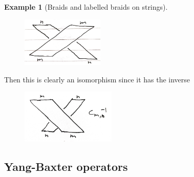 \documentclass[reqno]{amsart}
\theoremstyle{definition}
\newtheorem{example}[theorem]{Example}
\theoremstyle{remark}
\begin{document}
\begin{example}[Braids and labelled braids on strings]
       \begin{figure}[H]
           \centering
           \includegraphics[width=0.35\textwidth]{braiding-on-braid-groupoid-2.jpeg}
           \label{fig:braiding-on-braid-groupoid-jpeg}
       \end{figure}
       Then this is clearly an isomorphism since it has
       the inverse

       \begin{figure}[H]
           \centering
           \includegraphics[width=0.4\textwidth]{inverse-braiding.jpeg}
           \label{fig:inverse-braiding-jpeg}
       \end{figure}


   \end{example}


\subsection{Yang-Baxter operators}
\end{document}
